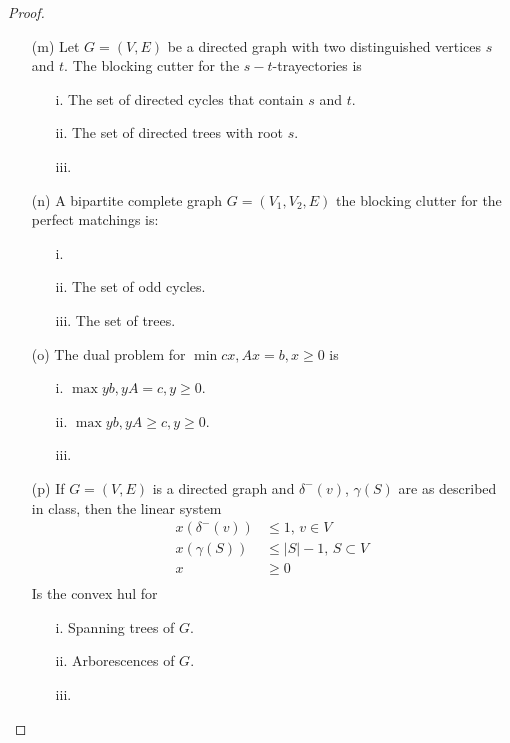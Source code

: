 \begin{proof}
\begin{itemize}
        \item[(m)]
                 Let $G = (V, E)$ be a directed graph with two distinguished vertices $s$ and $t$. The
                 blocking cutter for the $s-t$-trayectories is
                    \begin{itemize}
                        \item[i.] The set of directed cycles that contain $s$ and $t$.
                        \item[ii.] The set of directed trees with root $s$.
                        \item[iii.] 
                    \end{itemize}

        \item[(n)] A bipartite complete graph $G=(V_1, V_2, E)$ the blocking clutter for the perfect matchings is:
                    \begin{itemize}
                        \item[i.] 
                        \item[ii.] The set of odd cycles.
                        \item[iii.] The set of trees.
                    \end{itemize}

        \item[(o)] The dual problem for $\min cx, Ax = b, x \geq 0$ is
                    \begin{itemize}
                        \item[i.] $\max yb, yA = c, y \geq 0$.
                        \item[ii.] $\max yb, yA \geq c, y \geq 0$.
                        \item[iii.] 
                    \end{itemize}

        \item[(p)] If $G = (V, E)$ is a directed graph and $\delta^-(v)$, $\gamma(S)$ are as described in class,
                 then the linear system
                \begin{align}
                            x(\delta^-(v))  &\leq 1,\, v \in V          \\
                            x(\gamma(S))    &\leq |S|-1,\, S \subset V  \\
                            x               &\geq 0                     \\
                \end{align}
                Is the convex hul for
                    \begin{itemize}
                        \item[i.] Spanning trees of $G$.
                        \item[ii.] Arborescences of $G$.
                        \item[iii.] 
                    \end{itemize}


\end{itemize}
\end{proof}
